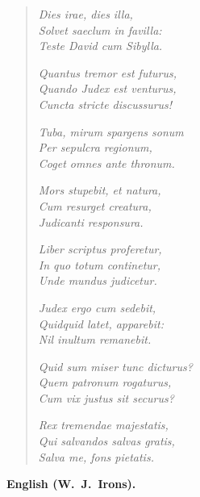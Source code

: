 \begin{quote}
\textit{Dies irae, dies illa,\\
Solvet saeclum in favilla:\\
Teste David cum Sibylla.}

\textit{Quantus tremor est futurus,\\
Quando Judex est venturus,\\
Cuncta stricte discussurus!}

\textit{Tuba, mirum spargens sonum\\
Per sepulcra regionum,\\
Coget omnes ante thronum.}

\textit{Mors stupebit, et natura,\\
Cum resurget creatura,\\
Judicanti responsura.}

\textit{Liber scriptus proferetur,\\
In quo totum continetur,\\
Unde mundus judicetur.}

\textit{Judex ergo cum sedebit,\\
Quidquid latet, apparebit:\\
Nil inultum remanebit.}

\textit{Quid sum miser tunc dicturus?\\
Quem patronum rogaturus,\\
Cum vix justus sit securus?}

\textit{Rex tremendae majestatis,\\
Qui salvandos salvas gratis,\\
Salva me, fons pietatis.}
\end{quote}

\textbf{English (W.\ J.\ Irons).}

